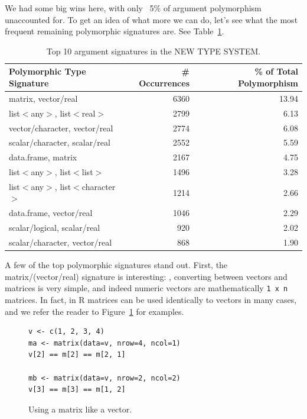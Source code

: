 \documentclass[acmsmall,10pt,review,anonymous]{acmart}\settopmatter{printfolios=true,printccs=false,printacmref=false}
\begin{document}
We had some big wins here, with only ~5\% of argument polymorphism unaccounted for.
To get an idea of what more we can do, let's see what the most frequent remaining polymorphic signatures are.
See Table~\ref{tab:toppolyWHATTS}.

\begin{table}[ht]
\label{tab:toppolyWHATTS}
\centering
\begin{tabular}{lrr}
  \hline
Polymorphic Type Signature & \# Occurrences & \% of Total Polymorphism \\ 
  \hline
  matrix, vector/real & 6360 & 13.94 \\ 
  list$<$any$>$, list$<$real$>$ & 2799 & 6.13 \\ 
  vector/character, vector/real & 2774 & 6.08 \\ 
  scalar/character, scalar/real & 2552 & 5.59 \\ 
  data.frame, matrix & 2167 & 4.75 \\ 
  list$<$any$>$, list$<$list$>$ & 1496 & 3.28 \\ 
  list$<$any$>$, list$<$character$>$ & 1214 & 2.66 \\ 
  data.frame, vector/real & 1046 & 2.29 \\ 
  scalar/logical, scalar/real & 920 & 2.02 \\ 
  scalar/character, vector/real & 868 & 1.90 \\
   \hline
\end{tabular}
\caption{Top 10 argument signatures in the NEW TYPE SYSTEM.}
\end{table}

A few of the top polymorphic signatures stand out.
First, the matrix/(vector/real) signature is interesting: , converting between vectors and matrices is very simple, and indeed numeric vectors are mathematically {\tt 1 x n} matrices.
In fact, in R matrices can be used identically to vectors in many cases, and we refer the reader to Figure~\ref{fig:matasvec} for examples.
\begin{figure}[!hb]{\small\begin{lstlisting}[style=R]
v <- c(1, 2, 3, 4)
ma <- matrix(data=v, nrow=4, ncol=1)
v[2] == m[2] == m[2, 1]

mb <- matrix(data=v, nrow=2, ncol=2)
v[3] == m[3] == m[1, 2] 
\end{lstlisting}}\caption{Using a matrix like a vector.}\label{fig:matasvec}\end{figure}
\end{document}
